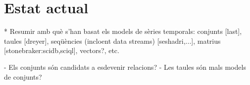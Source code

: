 



\section{Estat actual}

* Resumir amb què s'han basat els models de sèries temporals: conjunts [last], taules [dreyer], seqüències (incloent data streams) [seshadri,...], matrius [stonebraker:scidb,sciql],  vectors?, etc.
 
  - Els conjunts són candidats a esdevenir relacions?
  - Les taules són mals models de conjunts?